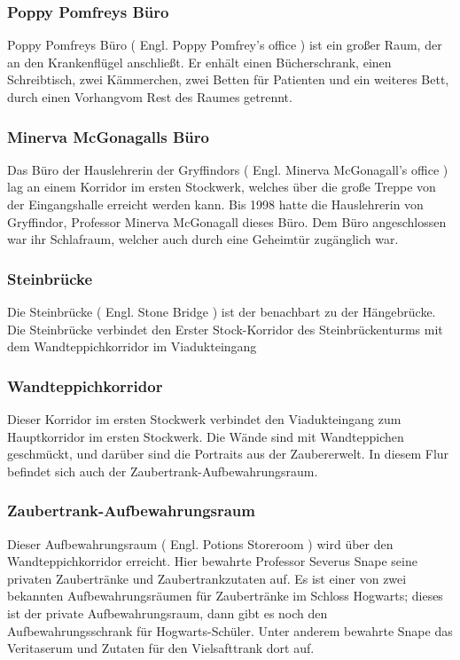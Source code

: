 \documentclass[a4paper, 10pt]{article}
\begin{document}
\subsubsection*{\large Poppy Pomfreys Büro}
Poppy Pomfreys Büro (  Engl.  Poppy Pomfrey's office ) ist ein großer Raum, der an den Krankenflügel anschließt. Er enhält einen Bücherschrank, einen Schreibtisch, zwei Kämmerchen, zwei Betten für Patienten und ein weiteres Bett, durch einen Vorhangvom Rest des Raumes getrennt.
\subsubsection*{\large Minerva McGonagalls Büro}
Das Büro der Hauslehrerin der Gryffindors (  Engl.  Minerva McGonagall's office ) lag an einem Korridor im ersten Stockwerk, welches über die große Treppe von der Eingangshalle erreicht werden kann. Bis 1998 hatte die Hauslehrerin von Gryffindor, Professor Minerva McGonagall dieses Büro. Dem Büro angeschlossen war ihr Schlafraum, welcher auch durch eine Geheimtür zugänglich war.
\subsubsection*{\large Steinbrücke}
Die Steinbrücke (  Engl.  Stone Bridge ) ist der benachbart zu der Hängebrücke. Die Steinbrücke verbindet den Erster Stock-Korridor des Steinbrückenturms mit dem Wandteppichkorridor im Viadukteingang
\subsubsection*{\large Wandteppichkorridor}
Dieser Korridor im ersten Stockwerk verbindet den Viadukteingang zum Hauptkorridor im ersten Stockwerk. Die Wände sind mit Wandteppichen geschmückt, und darüber sind die Portraits aus der Zaubererwelt. In diesem Flur befindet sich auch der Zaubertrank-Aufbewahrungsraum.
\subsubsection*{\large Zaubertrank-Aufbewahrungsraum}
Dieser Aufbewahrungsraum (  Engl.  Potions Storeroom ) wird über den Wandteppichkorridor erreicht. Hier bewahrte Professor Severus Snape seine privaten Zaubertränke und Zaubertrankzutaten auf. Es ist einer von zwei bekannten Aufbewahrungsräumen für Zaubertränke im Schloss Hogwarts; dieses ist der private Aufbewahrungsraum, dann gibt es noch den Aufbewahrungsschrank für Hogwarts-Schüler. Unter anderem bewahrte Snape das Veritaserum und Zutaten für den Vielsafttrank dort auf.
\end{document}
